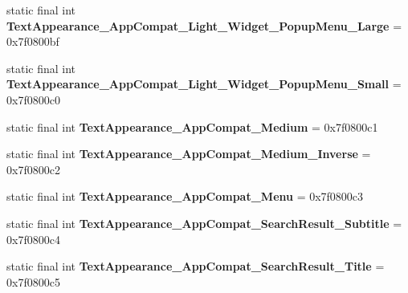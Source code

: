 \begin{DoxyCompactItemize}
\item 
\hypertarget{classandroid_1_1support_1_1v7_1_1appcompat_1_1_r_1_1style_a148472e911d0046b356b15cfc12dfa3a}{}static final int {\bfseries Text\+Appearance\+\_\+\+App\+Compat\+\_\+\+Light\+\_\+\+Widget\+\_\+\+Popup\+Menu\+\_\+\+Large} = 0x7f0800bf\label{classandroid_1_1support_1_1v7_1_1appcompat_1_1_r_1_1style_a148472e911d0046b356b15cfc12dfa3a}

\item 
\hypertarget{classandroid_1_1support_1_1v7_1_1appcompat_1_1_r_1_1style_aab3ede0d3b744bbff6ea1fd27f8d6b3c}{}static final int {\bfseries Text\+Appearance\+\_\+\+App\+Compat\+\_\+\+Light\+\_\+\+Widget\+\_\+\+Popup\+Menu\+\_\+\+Small} = 0x7f0800c0\label{classandroid_1_1support_1_1v7_1_1appcompat_1_1_r_1_1style_aab3ede0d3b744bbff6ea1fd27f8d6b3c}

\item 
\hypertarget{classandroid_1_1support_1_1v7_1_1appcompat_1_1_r_1_1style_a772ffada512c435e31ffaebade3ed642}{}static final int {\bfseries Text\+Appearance\+\_\+\+App\+Compat\+\_\+\+Medium} = 0x7f0800c1\label{classandroid_1_1support_1_1v7_1_1appcompat_1_1_r_1_1style_a772ffada512c435e31ffaebade3ed642}

\item 
\hypertarget{classandroid_1_1support_1_1v7_1_1appcompat_1_1_r_1_1style_a8fa231cf7e54979201ef2a3fb3b336b0}{}static final int {\bfseries Text\+Appearance\+\_\+\+App\+Compat\+\_\+\+Medium\+\_\+\+Inverse} = 0x7f0800c2\label{classandroid_1_1support_1_1v7_1_1appcompat_1_1_r_1_1style_a8fa231cf7e54979201ef2a3fb3b336b0}

\item 
\hypertarget{classandroid_1_1support_1_1v7_1_1appcompat_1_1_r_1_1style_a22812bea24f97e75e0f4a149ace3e8e9}{}static final int {\bfseries Text\+Appearance\+\_\+\+App\+Compat\+\_\+\+Menu} = 0x7f0800c3\label{classandroid_1_1support_1_1v7_1_1appcompat_1_1_r_1_1style_a22812bea24f97e75e0f4a149ace3e8e9}

\item 
\hypertarget{classandroid_1_1support_1_1v7_1_1appcompat_1_1_r_1_1style_abc8d67744de25dad47ee20f7558b9e61}{}static final int {\bfseries Text\+Appearance\+\_\+\+App\+Compat\+\_\+\+Search\+Result\+\_\+\+Subtitle} = 0x7f0800c4\label{classandroid_1_1support_1_1v7_1_1appcompat_1_1_r_1_1style_abc8d67744de25dad47ee20f7558b9e61}

\item 
\hypertarget{classandroid_1_1support_1_1v7_1_1appcompat_1_1_r_1_1style_a2bb5c5d5e65b3e1c48527de626155a79}{}static final int {\bfseries Text\+Appearance\+\_\+\+App\+Compat\+\_\+\+Search\+Result\+\_\+\+Title} = 0x7f0800c5\label{classandroid_1_1support_1_1v7_1_1appcompat_1_1_r_1_1style_a2bb5c5d5e65b3e1c48527de626155a79}


\end{DoxyCompactItemize}
